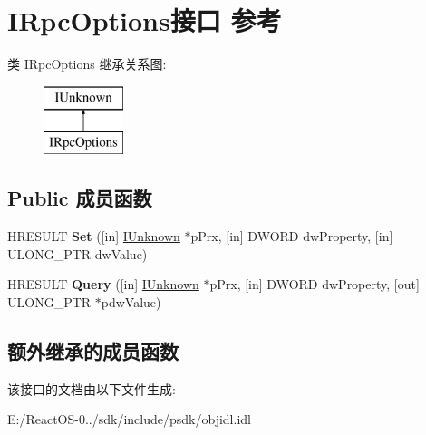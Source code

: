\hypertarget{interface_i_rpc_options}{}\section{I\+Rpc\+Options接口 参考}
\label{interface_i_rpc_options}
类 I\+Rpc\+Options 继承关系图\+:\begin{figure}[H]
\begin{center}
\leavevmode
\includegraphics[height=2.000000cm]{interface_i_rpc_options}
\end{center}
\end{figure}
\subsection*{Public 成员函数}
\begin{DoxyCompactItemize}
\item 
\mbox{\label{interface_i_rpc_options_a36d392c01171ddb2b712b1100ce21afd}} 
H\+R\+E\+S\+U\+LT {\bfseries Set} (\mbox{[}in\mbox{]} \hyperlink{interface_i_unknown}{I\+Unknown} $\ast$p\+Prx, \mbox{[}in\mbox{]} D\+W\+O\+RD dw\+Property, \mbox{[}in\mbox{]} U\+L\+O\+N\+G\+\_\+\+P\+TR dw\+Value)
\item 
\mbox{\label{interface_i_rpc_options_a1dd4500c49824e36af2d4820afe789dd}} 
H\+R\+E\+S\+U\+LT {\bfseries Query} (\mbox{[}in\mbox{]} \hyperlink{interface_i_unknown}{I\+Unknown} $\ast$p\+Prx, \mbox{[}in\mbox{]} D\+W\+O\+RD dw\+Property, \mbox{[}out\mbox{]} U\+L\+O\+N\+G\+\_\+\+P\+TR $\ast$pdw\+Value)
\end{DoxyCompactItemize}
\subsection*{额外继承的成员函数}


该接口的文档由以下文件生成\+:\begin{DoxyCompactItemize}
\item 
E\+:/\+React\+O\+S-\/0../sdk/include/psdk/objidl.\+idl\end{DoxyCompactItemize}
